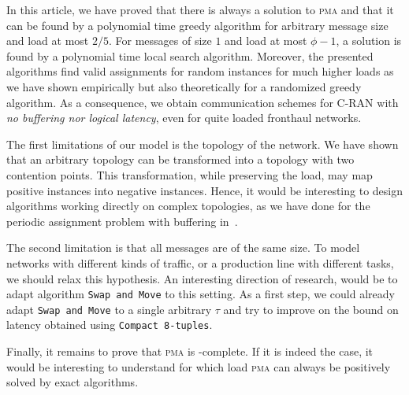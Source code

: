 \documentclass[a4paper,UKenglish,cleveref, autoref, thm-restate]{lipics-v2019}
\newcommand\pma{\textsc{pma}\xspace}
\newcommand\swapandmove{\texttt{Swap and Move}\xspace}
\begin{document}
In this article, we have proved that there is always a solution to \pma and that it can be found by a polynomial time greedy algorithm for arbitrary message size and load at most $2/5$. For messages of size $1$ and load at most $\phi - 1$, a solution is found by a polynomial time local search algorithm. Moreover, the presented algorithms find valid assignments for random instances for much higher loads as we have shown empirically but also theoretically for a randomized greedy algorithm. As a consequence, we obtain communication schemes for C-RAN with \emph{no buffering nor logical latency}, even for quite loaded fronthaul networks.

The first limitations of our model is the topology of the network. We have shown that an arbitrary topology can be transformed into a topology with two contention points. This transformation, while preserving the load, may map positive instances into negative instances. Hence, it would be interesting to design algorithms working directly on complex topologies, as we have done for the periodic assignment problem with buffering in~\cite{guiraud2021deterministic}.

The second limitation is that all messages are of the same size. 
To model networks with different kinds of traffic, or a production line with different tasks, we should relax this hypothesis. An interesting direction of research, would be to adapt algorithm \swapandmove to this setting. As a first step, we could already adapt \swapandmove to a single arbitrary $\tau$ and try to improve on the bound on latency obtained using \texttt{Compact 8-tuples}.

Finally, it remains to prove that \pma is \NP-complete. If it is indeed the case, it would be interesting to understand for which load \pma can always be positively solved by exact algorithms. 


\end{document}
